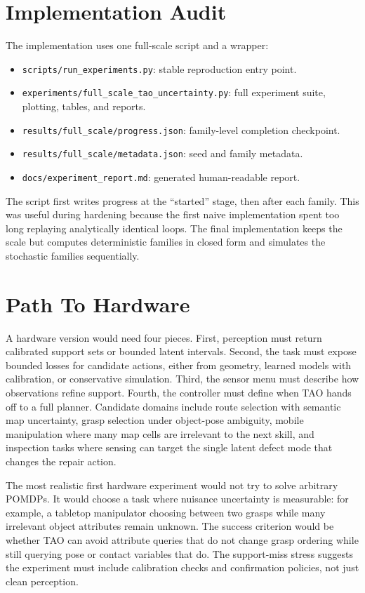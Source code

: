 \documentclass{article}
\begin{document}
\section{Implementation Audit}

The implementation uses one full-scale script and a wrapper:
\begin{itemize}
  \item \texttt{scripts/run\_experiments.py}: stable reproduction entry point.
  \item \texttt{experiments/full\_scale\_tao\_uncertainty.py}: full experiment suite, plotting, tables, and reports.
  \item \texttt{results/full\_scale/progress.json}: family-level completion checkpoint.
  \item \texttt{results/full\_scale/metadata.json}: seed and family metadata.
  \item \texttt{docs/experiment\_report.md}: generated human-readable report.
\end{itemize}
The script first writes progress at the ``started'' stage, then after each family. This was useful during hardening because the first naive implementation spent too long replaying analytically identical loops. The final implementation keeps the scale but computes deterministic families in closed form and simulates the stochastic families sequentially.

\section{Path To Hardware}

A hardware version would need four pieces. First, perception must return calibrated support sets or bounded latent intervals. Second, the task must expose bounded losses for candidate actions, either from geometry, learned models with calibration, or conservative simulation. Third, the sensor menu must describe how observations refine support. Fourth, the controller must define when TAO hands off to a full planner. Candidate domains include route selection with semantic map uncertainty, grasp selection under object-pose ambiguity, mobile manipulation where many map cells are irrelevant to the next skill, and inspection tasks where sensing can target the single latent defect mode that changes the repair action.

The most realistic first hardware experiment would not try to solve arbitrary POMDPs. It would choose a task where nuisance uncertainty is measurable: for example, a tabletop manipulator choosing between two grasps while many irrelevant object attributes remain unknown. The success criterion would be whether TAO can avoid attribute queries that do not change grasp ordering while still querying pose or contact variables that do. The support-miss stress suggests the experiment must include calibration checks and confirmation policies, not just clean perception.
\end{document}
